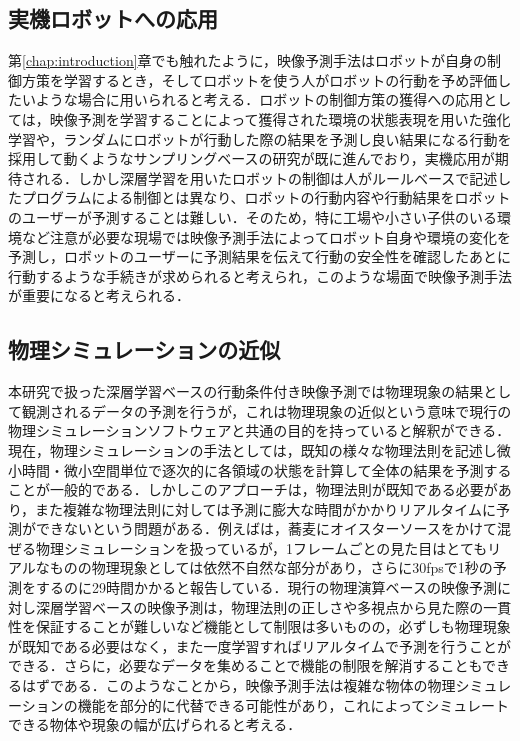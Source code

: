 \subsection{実機ロボットへの応用}
第\ref{chap:introduction}章でも触れたように，映像予測手法はロボットが自身の制御方策を学習するとき，そしてロボットを使う人がロボットの行動を予め評価したいような場合に用いられると考える．ロボットの制御方策の獲得への応用としては，映像予測を学習することによって獲得された環境の状態表現を用いた強化学習や，ランダムにロボットが行動した際の結果を予測し良い結果になる行動を採用して動くようなサンプリングベースの研究が既に進んでおり，実機応用が期待される．しかし深層学習を用いたロボットの制御は人がルールベースで記述したプログラムによる制御とは異なり、ロボットの行動内容や行動結果をロボットのユーザーが予測することは難しい．そのため，特に工場や小さい子供のいる環境など注意が必要な現場では映像予測手法によってロボット自身や環境の変化を予測し，ロボットのユーザーに予測結果を伝えて行動の安全性を確認したあとに行動するような手続きが求められると考えられ，このような場面で映像予測手法が重要になると考えられる．

\subsection{物理シミュレーションの近似}

本研究で扱った深層学習ベースの行動条件付き映像予測では物理現象の結果として観測されるデータの予測を行うが，これは物理現象の近似という意味で現行の物理シミュレーションソフトウェアと共通の目的を持っていると解釈ができる．現在，物理シミュレーションの手法としては，既知の様々な物理法則を記述し微小時間・微小空間単位で逐次的に各領域の状態を計算して全体の結果を予測することが一般的である．しかしこのアプローチは，物理法則が既知である必要があり，また複雑な物理法則に対しては予測に膨大な時間がかかりリアルタイムに予測ができないという問題がある．例えば\cite{fei2019multi}は，蕎麦にオイスターソースをかけて混ぜる物理シミュレーションを扱っているが，1フレームごとの見た目はとてもリアルなものの物理現象としては依然不自然な部分があり，さらに30fpsで1秒の予測をするのに29時間かかると報告している．現行の物理演算ベースの映像予測に対し深層学習ベースの映像予測は，物理法則の正しさや多視点から見た際の一貫性を保証することが難しいなど機能として制限は多いものの，必ずしも物理現象が既知である必要はなく，また一度学習すればリアルタイムで予測を行うことができる．さらに，必要なデータを集めることで機能の制限を解消することもできるはずである．このようなことから，映像予測手法は複雑な物体の物理シミュレーションの機能を部分的に代替できる可能性があり，これによってシミュレートできる物体や現象の幅が広げられると考える．

